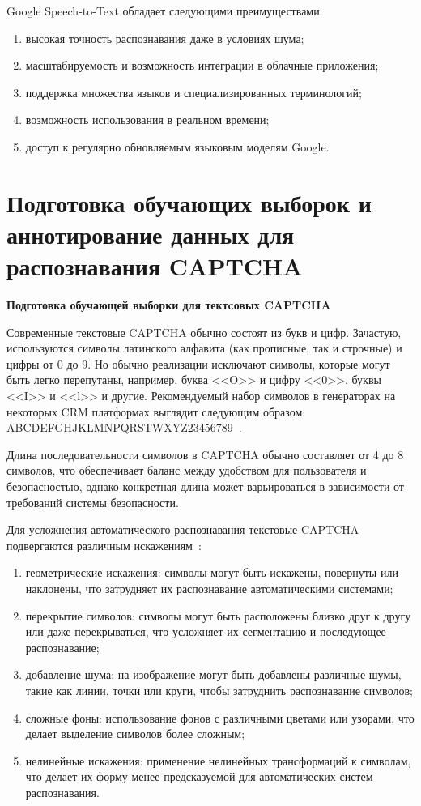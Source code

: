 Google Speech-to-Text обладает следующими преимуществами:

\begin{enumerate}
    \item высокая точность распознавания даже в условиях шума;
    \item масштабируемость и возможность интеграции в облачные приложения;
    \item поддержка множества языков и специализированных терминологий;
    \item возможность использования в реальном времени;
    \item доступ к регулярно обновляемым языковым моделям Google.
\end{enumerate}

\section{Подготовка обучающих выборок и аннотирование данных для распознавания CAPTCHA}

\textbf{Подготовка обучающей выборки для тектcовых CAPTCHA}

Современные текстовые CAPTCHA обычно состоят из букв и цифр. Зачастую, 
используются символы латинского алфавита (как прописные, так и строчные) и цифры 
от 0 до 9. Но обычно реализации исключают символы, которые могут быть легко 
перепутаны, например, буква <<O>> и цифру <<0>>, буквы <<I>> и <<l>> и другие. 
Рекомендуемый набор символов в генераторах на некоторых CRM платформах выглядит 
следующим образом: ABCDEFGHJKLMNPQRSTWXYZ23456789~\cite{Bitrix}.

Длина последовательности символов в CAPTCHA обычно составляет от 4 до 8 символов, 
что обеспечивает баланс между удобством для пользователя и безопасностью, однако 
конкретная длина может варьироваться в зависимости от требований системы 
безопасности.

Для усложнения автоматического распознавания текстовые CAPTCHA подвергаются 
различным искажениям~\cite{HabrCaptcha, Proglib}:

\begin{enumerate}
    \item геометрические искажения: символы могут быть искажены, повернуты или 
    наклонены, что затрудняет их распознавание автоматическими системами;
    \item перекрытие символов: символы могут быть расположены близко друг к 
    другу или даже перекрываться, что усложняет их сегментацию и последующее 
    распознавание;
    \item добавление шума: на изображение могут быть добавлены различные шумы, 
    такие как линии, точки или круги, чтобы затруднить распознавание символов;
    \item сложные фоны: использование фонов с различными цветами или узорами, 
    что делает выделение символов более сложным;
    \item нелинейные искажения: применение нелинейных трансформаций к символам, 
    что делает их форму менее предсказуемой для автоматических систем 
    распознавания.
\end{enumerate}


